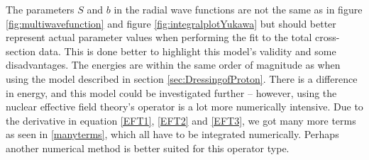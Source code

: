 The parameters $S$ and $b$ in the radial wave functions are not the same as in figure \ref{fig:multiwavefunction} and figure \ref{fig:integralplotYukawa} but should better represent actual parameter values when performing the fit to the total cross-section data. This is done better to highlight this model's validity and some disadvantages. The energies are within the same order of magnitude as when using the model described in section \ref{sec:DressingofProton}. There is a difference in energy, and this model could be investigated further -- however, using the nuclear effective field theory's operator is a lot more numerically intensive. Due to the derivative in equation \eqref{EFT1}, \eqref{EFT2} and \eqref{EFT3}, we got many more terms as seen in \eqref{manyterms}, which all have to be integrated numerically. Perhaps another numerical method is better suited for this operator type.
\clearpage
\thispagestyle{empty}\mbox{}
\clearpage

